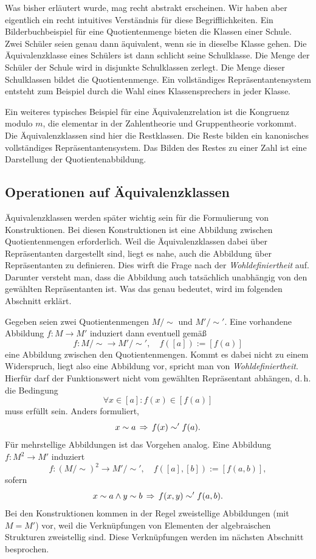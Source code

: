 Was bisher erläutert wurde, mag recht abstrakt erscheinen. Wir haben
aber eigentlich ein recht intuitives Verständnis für diese
Begrifflichkeiten. Ein Bilderbuchbeispiel für eine Quotientenmenge
bieten die Klassen einer Schule. Zwei Schüler seien genau dann
äquivalent, wenn sie in dieselbe Klasse gehen. Die Äquivalenzklasse eines
Schülers ist dann schlicht seine Schulklasse. Die Menge der Schüler der
Schule wird in disjunkte Schulklassen zerlegt. Die Menge dieser
Schulklassen bildet die Quotientenmenge. Ein vollständiges
Repräsentantensystem entsteht zum Beispiel durch die Wahl eines
Klassensprechers in jeder Klasse.

Ein weiteres typisches Beispiel für eine Äquivalenzrelation ist die
Kongruenz modulo $m$, die elementar in der Zahlentheorie
und Gruppentheorie vorkommt. Die Äquivalenzklassen sind hier die
Restklassen. Die Reste bilden ein kanonisches vollständiges
Repräsentantensystem. Das Bilden des Restes zu einer Zahl ist
eine Darstellung der Quotientenabbildung.

\subsection{Operationen auf Äquivalenzklassen}

Äquivalenzklassen werden später wichtig sein für die Formulierung von
Konstruktionen. Bei diesen Konstruktionen ist eine Abbildung
zwischen Quotientenmengen erforderlich. Weil die Äquivalenzklassen
dabei über Repräsentanten dargestellt sind, liegt es nahe, auch
die Abbildung über Repräsentanten zu definieren. Dies wirft die
Frage nach der \emph{Wohldefiniertheit} auf.
Darunter versteht man, dass die Abbildung auch tatsächlich unabhängig
von den gewählten Repräsentanten ist. Was das genau bedeutet, wird im
folgenden Abschnitt erklärt.

Gegeben seien zwei Quotientenmengen $M/\sim$ und $M'/\sim'$.
Eine vorhandene Abbildung $f\colon M\to M'$ induziert dann
eventuell gemäß\label{wohldefiniert}%
\[f\colon M/\sim\to M'/\sim',\quad f([a]):=[f(a)]\]
eine Abbildung zwischen den Quotientenmengen. Kommt es dabei nicht
zu einem Widerspruch, liegt also eine Abbildung vor, spricht man
von \emph{Wohldefiniertheit}. Hierfür darf der Funktionswert nicht
vom gewählten Repräsentant abhängen, d.\,h. die Bedingung%
\[\forall x\in [a]\colon f(x)\in [f(a)]\]
muss erfüllt sein. Anders formuliert,
\[x\sim a\, \Rightarrow\, f(x)\sim' f(a).\]
Für mehrstellige Abbildungen ist das Vorgehen analog. Eine
Abbildung $f\colon M^2\to M'$ induziert%
\[f\colon (M/\sim)^2\to M'/\sim',\quad f([a],[b]):=[f(a,b)],\]
sofern
\[x\sim a\land y\sim b\, \Rightarrow\, f(x,y)\sim' f(a,b).\]
Bei den Konstruktionen kommen in der Regel zweistellige Abbildungen
(mit $M=M'$) vor, weil die Verknüpfungen von Elementen der algebraischen
Strukturen zweistellig sind. Diese Verknüpfungen werden im nächsten
Abschnitt besprochen.

